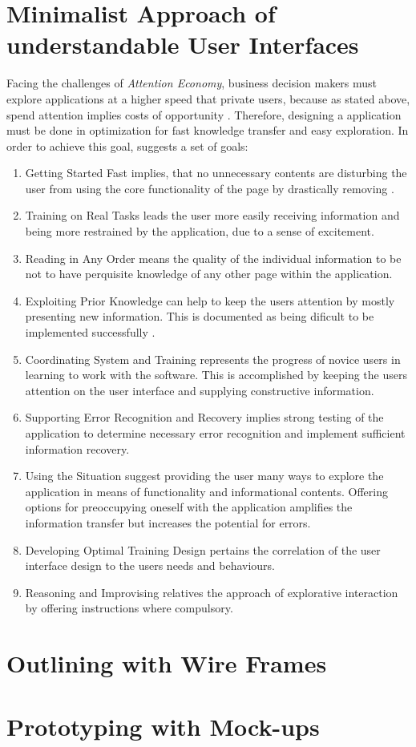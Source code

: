 \section{Minimalist Approach of understandable User Interfaces}
Facing the challenges of \textit{Attention Economy}, business decision makers must explore applications at a higher speed that private users, because as stated above, spend attention implies costs of opportunity \parencite[cf.][]{Bakar.2017}. Therefore, designing a application must be done in optimization for fast knowledge transfer and easy exploration. In order to achieve this goal, \textcite{Bakar.2017} suggests a set of goals:
\begin{enumerate}
\item{Getting Started Fast} implies, that no unnecessary contents are disturbing the user from using the core functionality of the page by drastically removing   \parencite{Bakar.2017}.
\item{Training on Real Tasks} leads the user more easily receiving information and being more restrained by the application, due to a sense of excitement.
\item{Reading in Any Order} means the quality of the individual information to be not to have perquisite knowledge of any other page within the application.
\item{Exploiting Prior Knowledge} can help to keep the users attention by mostly presenting new information. This is documented as being dificult to be implemented successfully .
\item{Coordinating System and Training} represents the progress of novice users in learning to work with the software. This is accomplished by keeping the users attention on the user interface and supplying constructive information.
\item{Supporting Error Recognition and Recovery} implies strong testing of the application to determine necessary error recognition and implement sufficient information recovery.
\item{Using the Situation} suggest providing the user many ways to explore the application in means of functionality and informational contents. Offering options for preoccupying oneself with the application amplifies the information transfer but increases the potential for errors.
\item{Developing Optimal Training Design} pertains the correlation of the user interface design to the users needs and behaviours. 
\item{Reasoning and Improvising} relatives the approach of explorative interaction by offering instructions where compulsory.
\end{enumerate}

\section{Outlining with Wire Frames}
\clearpage
\section{Prototyping with Mock-ups}
